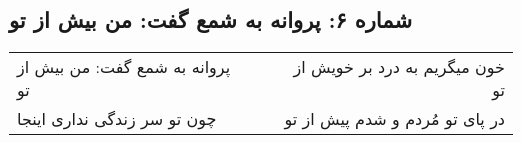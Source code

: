 \begin{center}
\section*{شماره ۶: پروانه به شمع گفت: من بیش از تو}
\label{sec:006}
\begin{longtable}{l p{0.5cm} r}
پروانه به شمع گفت: من بیش از تو
&&
خون میگریم به درد بر خویش از تو
\\
چون تو سر زندگی نداری اینجا
&&
در پای تو مُردم و شدم پیش از تو
\\
\end{longtable}
\end{center}
